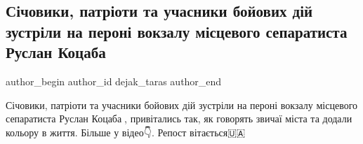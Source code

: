  
 
 
 
 
 
\subsection{Січовики, патріоти та учасники бойових дій зустріли на пероні вокзалу місцевого сепаратиста Руслан Коцаба}
\label{sec:25_06_2021.fb.dejak_taras.1.ruslan_kocaba}
\ifcmt
 author_begin
   author_id dejak_taras
 author_end
\fi

Січовики, патріоти та учасники бойових дій зустріли на пероні вокзалу місцевого
сепаратиста Руслан Коцаба🐔, привітались так, як говорять звичаї міста та
додали кольору в життя.  Більше у відео👇.  Репост вітається🇺🇦

